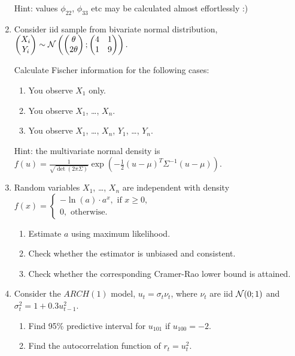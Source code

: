 \begin{enumerate}
Hint: values $\phi_{22}$, $\phi_{33}$ etc may be calculated almost effortlessly :)

\item Consider iid sample from bivariate normal distribution, 
$
\begin{pmatrix}
	X_i \\
	Y_i \\
\end{pmatrix}	 \sim \mathcal{N} \left(     
\begin{pmatrix}
	\theta \\
	2\theta \\
\end{pmatrix}; 
\begin{pmatrix}
	4 & 1 \\
	1 & 9 \\
\end{pmatrix}
\right).
$

Calculate Fischer information for the following cases: 
\begin{enumerate}
	\item You observe $X_1$ only. 
	\item You observe $X_1$, \ldots, $X_n$.
	\item You observe $X_1$, \ldots, $X_n$, $Y_1$, \ldots, $Y_n$.
\end{enumerate}

Hint: the multivariate normal density is 
$
f(u) = \frac{1}{\sqrt{\det(2\pi \Sigma)}} \exp( -\frac{1}{2}(u-\mu)^T \Sigma^{-1}(u-\mu)).
$

\item Random variables $X_1$, \ldots, $X_n$ are independent with density 
$
f(x) = \begin{cases}
	-\ln(a) \cdot a^x, \text{ if } x\geq 0, \\
	0, \text{ otherwise.}
\end{cases}	
$
\begin{enumerate}
	\item Estimate $a$ using maximum likelihood. 
	\item Check whether the estimator is unbiased and consistent. 
	\item Check whether the corresponding Cramer-Rao lower bound is attained. 
\end{enumerate}

\item Consider the $ARCH(1)$ model, $u_t = \sigma_t \nu_t$, where $\nu_t$ are iid $\mathcal{N}(0;1)$ and 
$\sigma^2_t = 1 + 0.3 u_{t-1}^2$. 
\begin{enumerate}
	\item Find 95\% predictive interval for $u_{101}$ if $u_{100} = -2$.
	\item Find the autocorrelation function of $r_t = u_t^2$. 
\end{enumerate}


\end{enumerate}
